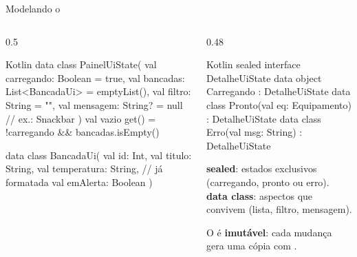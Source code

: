 \documentclass[aspectratio=169,10pt]{beamer}
\begin{document}
\begin{frame}[fragile]{Modelando o }
  \begin{columns}[T]
    \begin{column}{0.5\textwidth}
\begin{codigo}[title=Estado como data class]{Kotlin}
data class PainelUiState(
  val carregando: Boolean = true,
  val bancadas: List<BancadaUi> = emptyList(),
  val filtro: String = "",
  val mensagem: String? = null    // ex.: Snackbar
) {
  val vazio get() = !carregando && bancadas.isEmpty()
}

data class BancadaUi(
  val id: Int,
  val titulo: String,
  val temperatura: String,       // já formatada
  val emAlerta: Boolean
)
\end{codigo}
    \end{column}
    \begin{column}{0.48\textwidth}
\begin{codigo}[title=Ou como sealed interface]{Kotlin}
sealed interface DetalheUiState {
  data object Carregando : DetalheUiState
  data class Pronto(val eq: Equipamento)
    : DetalheUiState
  data class Erro(val msg: String)
    : DetalheUiState
}
\end{codigo}
      \begin{dica}
        \textbf{sealed}: estados exclusivos (carregando, pronto ou erro). \textbf{data class}: aspectos que convivem (lista, filtro, mensagem).
      \end{dica}
      \begin{conceito}
        O  é \textbf{imutável}: cada mudança gera uma cópia com .
      \end{conceito}
    \end{column}
  \end{columns}
\end{frame}
\end{document}

